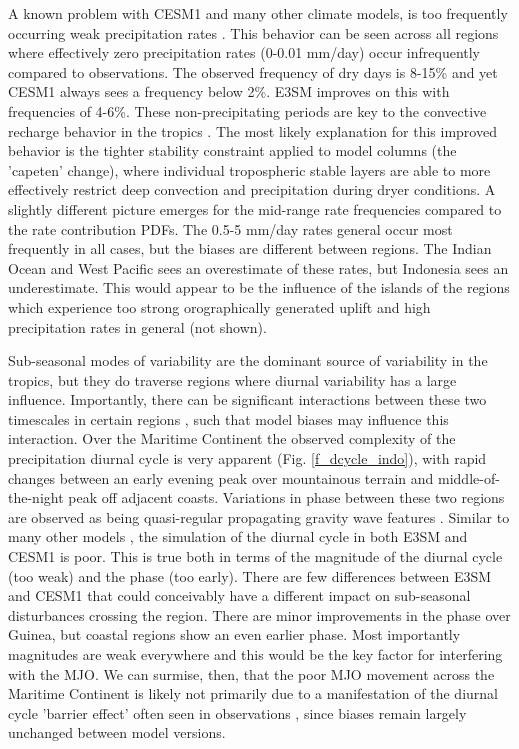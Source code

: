 \documentclass[draft,ms]{AGUTeX}
\begin{document}
\begin{article}
A known problem with CESM1 and many other climate models, is too frequently occurring weak precipitation rates \citep{Stephens2010}. This behavior can be seen across all regions where effectively zero precipitation rates (0-0.01 mm/day) occur infrequently compared to observations. The observed frequency of dry days is 8-15\% and yet CESM1 always sees a frequency below 2\%. E3SM improves on this with frequencies of 4-6\%. These non-precipitating periods are key to the convective recharge behavior in the tropics \citep{Xu2014}. The most likely explanation for this improved behavior is the tighter stability constraint applied to model columns (the 'capeten' change), where individual tropospheric stable layers are able to more effectively restrict deep convection and precipitation during dryer conditions. A slightly different picture emerges for the mid-range rate frequencies compared to the rate contribution PDFs. The 0.5-5 mm/day rates general occur most frequently in all cases, but the biases are different between regions. The Indian Ocean and West Pacific sees an overestimate of these rates, but Indonesia sees an underestimate. This would appear to be the influence of the islands of the regions which experience too strong orographically generated uplift and high precipitation rates in general (not shown).  



Sub-seasonal modes of variability are the dominant source of variability in the tropics, but they do traverse regions where diurnal variability has a large influence. Importantly, there can be significant interactions between these two timescales in certain regions \citep[e.g., ][]{Rauniyar2011}, such that model biases may influence this interaction. Over the Maritime Continent the observed complexity of the precipitation diurnal cycle is very apparent (Fig. \ref{f_dcycle_indo}), with rapid changes between an early evening peak over mountainous terrain and middle-of-the-night peak off adjacent coasts. Variations in phase between these two regions are observed as being quasi-regular propagating gravity wave features \citep{Mori2004}. Similar to many other models \citep{Dirmeyer2012}, the simulation of the diurnal cycle in both E3SM and CESM1 is poor. This is true both in terms of the magnitude of the diurnal cycle (too weak) and the phase (too early). There are few differences between E3SM and CESM1 that could conceivably have a different impact on sub-seasonal disturbances crossing the region. There are minor improvements in the phase over Guinea, but coastal regions show an even earlier phase. Most importantly magnitudes are weak everywhere and this would be the key factor for interfering with the MJO. We can surmise, then, that the poor MJO movement across the Maritime Continent is likely not primarily due to a manifestation of the diurnal cycle 'barrier effect' often seen in observations \citep[e.g.,][]{Ling2019}, since biases remain largely unchanged between model versions.





\end{article}
\end{document}
